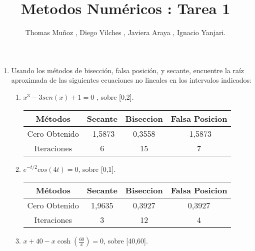 \documentclass{udparticle}
\title{Metodos Numéricos : Tarea 1}
\author{Thomas Muñoz , Diego Vilches , Javiera Araya , Ignacio Yanjari.}
\begin{document}
\maketitle

\begin{enumerate}

\item Usando los métodos de bisección, falsa posición, y secante, encuentre la raíz aproximada 
de las siguientes ecuaciones no lineales en los intervalos indicados:

\begin{enumerate}
    

\item  \(x^3 - 3sen(x) +1 = 0\) , sobre [0,2].
    \begin{table}[H]
    \centering
        \begin{tabular} { |c|c|c|c|}
        
        \hline
        Métodos       & Secante & Biseccion & Falsa Posicion  \\
        \hline
        Cero Obtenido &  -1,5873       &    0,3558       &      -1,5873           \\
        \hline
        Iteraciones   &     6        &      15     &        7         \\
        \hline
        
        \end{tabular}
    \end{table}
    
\item \( e^{-t/2} cos(4t) = 0 \), sobre [0,1].
    \begin{table}[H]
    \centering
        \begin{tabular} { |c|c|c|c|}
        
        \hline
        Métodos       & Secante & Biseccion & Falsa Posicion  \\
        \hline
        Cero Obtenido &  1,9635       &    0,3927       &      0,3927           \\
        \hline
        Iteraciones   &     3        &      12     &        4         \\
        \hline
        
        \end{tabular}
    \end{table}

\item \(x + 40 -x\cosh(\frac{60}{x}) = 0 \), sobre [40,60].
    \begin{table}[H]
    \centering
        \begin{tabular} { |c|c|c|c|}
        

\end{tabular}
\end{table}
\end{enumerate}
\end{enumerate}
\end{document}
